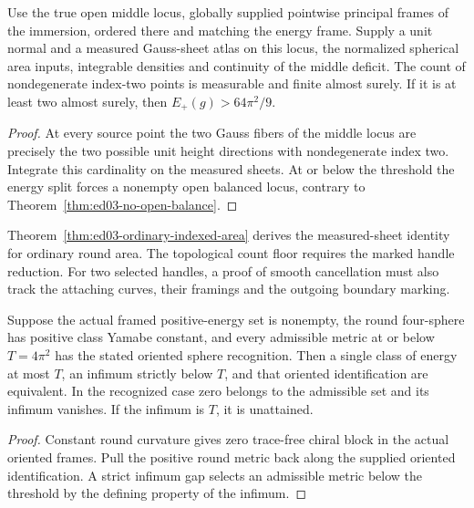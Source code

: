\begin{corollary}
\label{cor:ed03-strict-actual-height}
\leanok
Use the true open middle locus, globally supplied pointwise principal
frames of the immersion, ordered there and matching the energy frame.
Supply a unit normal and a measured Gauss-sheet atlas on this locus,
the normalized spherical area inputs, integrable densities and continuity
of the middle deficit. The count of nondegenerate index-two points is
measurable and finite almost surely. If it is at least two almost surely,
then \(E_+(g)>64\pi^2/9\).
\end{corollary}
\begin{proof}
\leanok
At every source point the two Gauss fibers of the middle locus are
precisely the two possible unit height directions with nondegenerate
index two. Integrate this cardinality on the measured sheets. At or
below the threshold the energy split forces a nonempty open balanced
locus, contrary to Theorem~\ref{thm:ed03-no-open-balance}.
\end{proof}
Theorem~\ref{thm:ed03-ordinary-indexed-area} derives the measured-sheet identity for ordinary round area. The topological count floor requires the marked handle reduction.
For two selected handles, a proof of smooth cancellation must also track
the attaching curves, their framings and the outgoing boundary marking.

\begin{corollary}
\label{cor:ed03-attained-class}
\leanok
Suppose the actual framed positive-energy set is nonempty, the round
four-sphere has positive class Yamabe constant, and every admissible
metric at or below \(T=4\pi^2\) has the stated oriented sphere recognition.
Then a single class of energy at most \(T\), an infimum strictly below
\(T\), and that oriented identification are equivalent. In the recognized
case zero belongs to the admissible set and its infimum vanishes.
If the infimum is \(T\), it is unattained.
\end{corollary}
\begin{proof}
\leanok
Constant round curvature gives zero trace-free chiral block in the actual
oriented frames. Pull the positive round metric back along the supplied
oriented identification. A strict infimum gap selects an admissible
metric below the threshold by the defining property of the infimum.
\end{proof}

